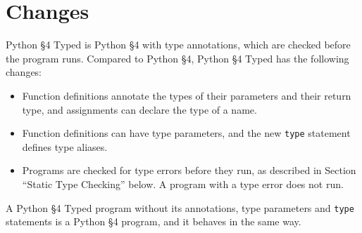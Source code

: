 





\section{Changes}

Python \S 4 Typed is Python \S 4 with type annotations, which are checked before the
program runs. Compared to Python \S 4, Python \S 4 Typed has the following changes:
\begin{itemize}
  \item Function definitions annotate the types of their parameters and their return type,
    and assignments can declare the type of a name.
  \item Function definitions can have type parameters, and the new \lstinline{type}
    statement defines type aliases.
  \item Programs are checked for type errors before they run, as described in Section
    ``Static Type Checking'' below. A program with a type error does not run.
\end{itemize}
A Python \S 4 Typed program without its annotations, type parameters and \lstinline{type}
statements is a Python \S 4 program, and it behaves in the same way.


\newpage









































